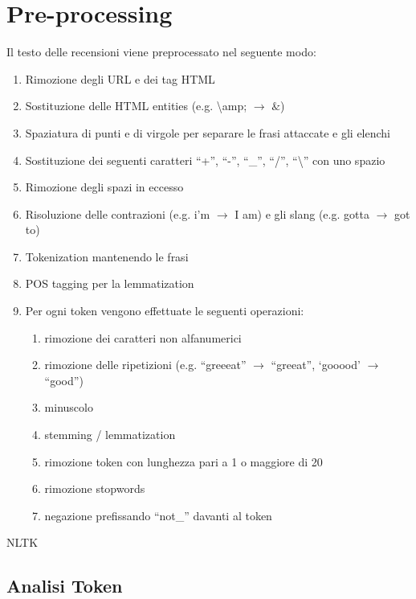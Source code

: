 \section{Pre-processing}

Il testo delle recensioni viene preprocessato nel seguente modo:

\begin{enumerate}
    \item Rimozione degli URL e dei tag HTML
    \item Sostituzione delle HTML entities (e.g. \textbackslash amp; $\rightarrow$ $\&$) 
    \item Spaziatura di punti e di virgole per separare le frasi attaccate e gli elenchi
    \item Sostituzione dei seguenti caratteri ``+'', ``-'', ``\_'', ``/'', ``\textbackslash'' con uno spazio
    \item Rimozione degli spazi in eccesso
    \item Risoluzione delle contrazioni (e.g. i'm $\rightarrow$ I am) e gli slang (e.g. gotta $\rightarrow$ got to)
    \item Tokenization mantenendo le frasi
    \item POS tagging per la lemmatization
    \item Per ogni token vengono effettuate le seguenti operazioni:
            \begin{enumerate}
                \item rimozione dei caratteri non alfanumerici
                \item rimozione delle ripetizioni (e.g. ``greeeat'' $\rightarrow$ ``greeat'', `gooood' $\rightarrow$ ``good'')
                \item minuscolo
                \item stemming / lemmatization
                \item rimozione token con lunghezza pari a 1 o maggiore di 20
                \item rimozione stopwords
                \item negazione prefissando ``not\_'' davanti al token
            \end{enumerate}
\end{enumerate}

NLTK

\subsection{Analisi Token}
